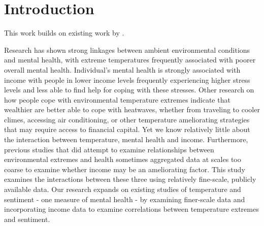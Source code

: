 \documentclass{article}
\begin{document}
    
\section{Introduction}



This work builds on existing work by \citep{baylis_weather_2018}. 


Research has shown strong linkages between ambient environmental conditions and mental health, with extreme temperatures  frequently associated with poorer overall mental health. Individual's mental health is strongly associated with income with people in lower income levels frequently experiencing higher stress levels and less able to find help for coping with these stresses. Other research on how people cope with environmental temperature extremes indicate that wealthier are better able to cope with heatwaves, whether from traveling to cooler climes, accessing air conditioning, or other temperature ameliorating strategies that may require access to financial capital. Yet we know relatively little about the interaction between temperature, mental health and income. Furthermore, previous studies that did attempt to examine relationships between environmental extremes and health sometimes aggregated data at scales too coarse to examine whether income may be an ameliorating factor. This study examines the interactions between these three using relatively fine-scale, publicly available data. Our research expands on existing studies of temperature and sentiment - one measure of mental health - by examining finer-scale data and incorporating income data to examine correlations between temperature extremes and sentiment.
\end{document}
